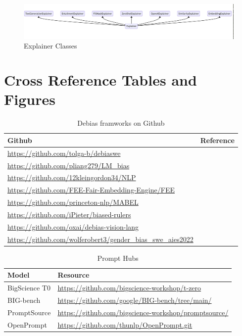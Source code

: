 \documentclass[11pt]{article}
\begin{document}
\begin{appendices}
\begin{figure}[H]
  \includegraphics[width=\linewidth]{img/explainerinheritance.png}
  \caption{Explainer Classes}
  \label{fig:explainerclasses}
\end{figure}

  

\section{Cross Reference Tables and Figures}\label{appendix:crossreferences}

\begin{table}[H]
\small
\centering
\begin{tabular}{l|l}
\hline
\textbf{Github} & \textbf{Reference}\\\hline
\url{https://github.com/tolga-b/debiaswe} & \citealt{bolukbasi2016man:16}\\
\url{https://github.com/pliang279/LM\_bias} & \citealt{liang2021towards:21}\\ 
\url{https://github.com/12kleingordon34/NLP} & \citealt{de2021stereotype:21}\\ 
\url{https://github.com/FEE-Fair-Embedding-Engine/FEE} & \citealt{kumar2020fair:20}\\ 
\url{https://github.com/princeton-nlp/MABEL} & \citealt{he2022mabel:22}\\
\url{https://github.com/iPieter/biased-rulers} & \citealt{delobelle2022measuring:22}\\
\url{https://github.com/oxai/debias-vision-lang} & \citealt{berg2022prompt:22}\\
\url{https://github.com/wolferobert3/gender\_bias\_swe\_aies2022} & \citealt{caliskan2022gender:22}\\
\hline
\end{tabular}
\caption{Debias framworks on Github}
\label{tab:debiasimpl}
\end{table}

\begin{table}[H]
\centering
\begin{tabular}{l|l}
\hline
\textbf{Model} & \textbf{Resource}\\\hline
BigScience T0 \citep{sanh2021multitask:21} & \url{https://github.com/bigscience-workshop/t-zero}\\
BIG-bench \citep{srivastava2022beyond:22} & \url{https://github.com/google/BIG-bench/tree/main/}\\
PromptSource \citep{bach2022promptsource:22} & \url{https://github.com/bigscience-workshop/promptsource/}\\
OpenPrompt \citep{ding2021openprompt:22} & \url{https://github.com/thunlp/OpenPrompt.git}\\
\hline
\end{tabular}
\caption{Prompt Hubs}
\label{tab:prompthubs}
\end{table}


\end{appendices}
\end{document}
